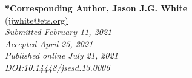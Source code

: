 \documentclass{sig-alternate} %
\begin{document}


\textbf{*Corresponding Author, Jason J.G. White}\\
\href{mailto: jjwhite@ets.org }{(jjwhite@ets.org)} \\
\textit{Submitted February 11, 2021 }\\
\textit{Accepted April 25, 2021} \\
\textit{Published online July 21, 2021} \\
\textit{DOI:10.14448/jsesd.13.0006} \\
\pagebreak

\vspace{5mm}
\section*{\vspace{140mm}}
\end{document}
